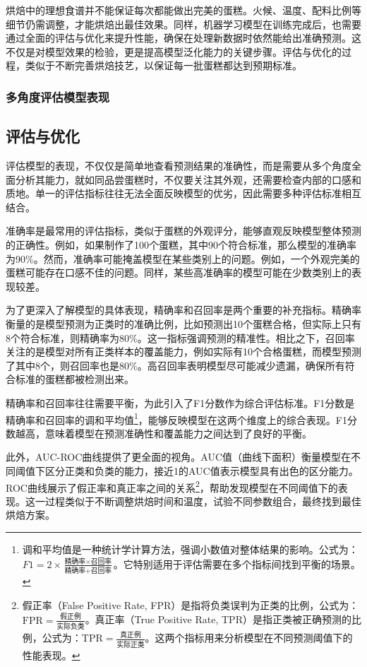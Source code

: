 烘焙中的理想食谱并不能保证每次都能做出完美的蛋糕。火候、温度、配料比例等细节仍需调整，才能烘焙出最佳效果。同样，机器学习模型在训练完成后，也需要通过全面的评估与优化来提升性能，确保在处理新数据时依然能给出准确预测。这不仅是对模型效果的检验，更是提高模型泛化能力的关键步骤。评估与优化的过程，类似于不断完善烘焙技艺，以保证每一批蛋糕都达到预期标准。

\subsubsection{多角度评估模型表现}

\subsection{评估与优化}

评估模型的表现，不仅仅是简单地查看预测结果的准确性，而是需要从多个角度全面分析其能力，就如同品尝蛋糕时，不仅要关注其外观，还需要检查内部的口感和质地。单一的评估指标往往无法全面反映模型的优劣，因此需要多种评估标准相互结合。

准确率是最常用的评估指标，类似于蛋糕的外观评分，能够直观反映模型整体预测的正确性。例如，如果制作了100个蛋糕，其中90个符合标准，那么模型的准确率为90\%。然而，准确率可能掩盖模型在某些类别上的问题。例如，一个外观完美的蛋糕可能存在口感不佳的问题。同样，某些高准确率的模型可能在少数类别上的表现较差。

为了更深入了解模型的具体表现，精确率和召回率是两个重要的补充指标。精确率衡量的是模型预测为正类时的准确比例，比如预测出10个蛋糕合格，但实际上只有8个符合标准，则精确率为80\%。这一指标强调预测的精准性。相比之下，召回率关注的是模型对所有正类样本的覆盖能力，例如实际有10个合格蛋糕，而模型预测了其中8个，则召回率也是80\%。高召回率表明模型尽可能减少遗漏，确保所有符合标准的蛋糕都被检测出来。

精确率和召回率往往需要平衡，为此引入了F1分数作为综合评估标准。F1分数是精确率和召回率的调和平均值\footnote{调和平均值是一种统计学计算方法，强调小数值对整体结果的影响。公式为：\( F1 = 2 \times \frac{\text{精确率} \times \text{召回率}}{\text{精确率} + \text{召回率}} \)。它特别适用于评估需要在多个指标间找到平衡的场景。}，能够反映模型在这两个维度上的综合表现。F1分数越高，意味着模型在预测准确性和覆盖能力之间达到了良好的平衡。

此外，AUC-ROC曲线提供了更全面的视角。AUC值（曲线下面积）衡量模型在不同阈值下区分正类和负类的能力，接近1的AUC值表示模型具有出色的区分能力。ROC曲线展示了假正率和真正率之间的关系\footnote{假正率（False Positive Rate, FPR）是指将负类误判为正类的比例，公式为：\( \text{FPR} = \frac{\text{假正例}}{\text{实际负类}} \)。真正率（True Positive Rate, TPR）是指正类被正确预测的比例，公式为：\( \text{TPR} = \frac{\text{真正例}}{\text{实际正类}} \)。这两个指标用来分析模型在不同预测阈值下的性能表现。}，帮助发现模型在不同阈值下的表现。这一过程类似于不断调整烘焙时间和温度，试验不同参数组合，最终找到最佳烘焙方案。

